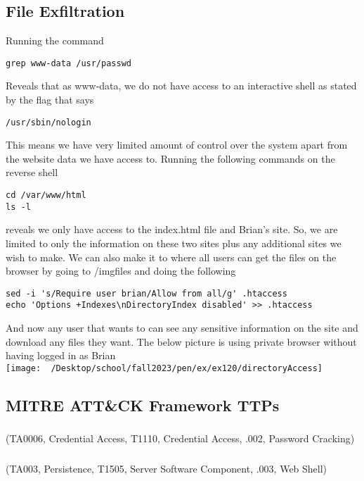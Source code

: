 \documentclass[notitlepage]{article}
\begin{document}
    \subsection{File Exfiltration}
    Running the command 
\begin{verbatim}
grep www-data /usr/passwd
\end{verbatim}
    Reveals that as www-data, we do not have access to an interactive shell as stated by the flag that says
\begin{verbatim}
/usr/sbin/nologin
\end{verbatim}
    This means we have very limited amount of control over the system apart from the website data we have access to. Running the following commands on the reverse shell
   \begin{verbatim}
cd /var/www/html
ls -l
   \end{verbatim}
   reveals we only have access to the index.html file and Brian's site. So, we are limited to only the information on these two sites plus any additional sites we wish to make.  We
   can also make it to where all users can get the files on the browser by going to /imgfiles and doing the following
\begin{verbatim}
sed -i 's/Require user brian/Allow from all/g' .htaccess
echo 'Options +Indexes\nDirectoryIndex disabled' >> .htaccess
\end{verbatim}
    And now any user that wants to can see any sensitive information on the site and download any files they want. The below picture is using private browser without having
    logged in as Brian \\
\texttt{[image: ~/Desktop/school/fall2023/pen/ex/ex120/directoryAccess]} \\


    \subsection{MITRE ATT{\&}CK Framework TTPs}    
	
    \subsubsection*{}
	\ttp(TA0006, Credential Access, T1110, Credential Access, .002, Password Cracking)
    
    \subsubsection*{}
	\ttp(TA003, Persistence, T1505, Server Software Component, .003, Web Shell) 
\end{document}
